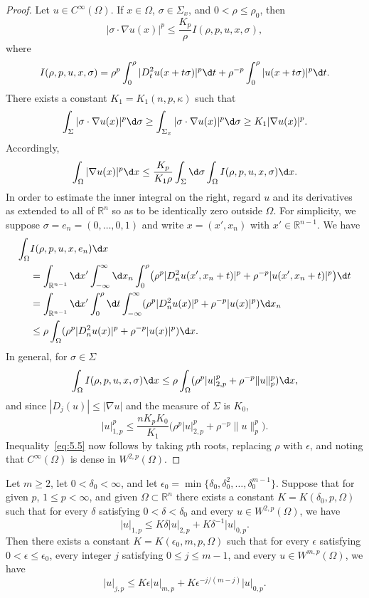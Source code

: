 \begin{proof}
  Let $u\in C^\infty(\Omega)$. If $x\in\Omega$, $\sigma\in\Sigma_x$,
  and $0<\rho\leq\rho_0$, then
  \[ |\sigma\cdot\nabla u(x)|^p \leq \frac{K_p}{\rho} I(\rho,p,u,x,\sigma), \]
  where
  \[ I(\rho,p,u,x,\sigma) = \rho^p \int_0^\rho |D_t^2 u(x+t\sigma)|^p \d t
      + \rho^{-p} \int_0^\rho |u(x+t\sigma)|^p \d t. \]
      There exists a constant $K_1=K_1(n,p,\kappa)$ such that
  \[\int_\Sigma |\sigma\cdot\nabla u(x)|^p \d\sigma
    \geq \int_{\Sigma_x} |\sigma\cdot\nabla u(x)|^p \d\sigma
    \geq K_1 |\nabla u(x)|^p.\]
  Accordingly,
  \[ \int_\Omega |\nabla u(x)|^p \d x
      \leq \frac{K_p}{K_1\rho} \int_\Sigma \d\sigma \int_\Omega I(\rho,p,u,x,\sigma) \d x. \]
  In order to estimate the inner integral on the right, regard $u$
  and its derivatives as extended to all of $\mathbb{R}^n$ so as to be
  identically zero outside $\Omega$. For simplicity, we suppose
  $\sigma = e_n = (0,\ldots,0,1)$ and write $x=(x',x_n)$ with $x'\in\mathbb{R}^{n-1}$.
  We have
  \begin{align*}
    \int_\Omega & I(\rho,p,u,x,e_n) \d x \\
    & = \int_{\mathbb{R}^{n-1}} \d x' \int_{-\infty}^\infty \d x_n
        \int_0^\rho \bigl(\rho^p |D_n^2 u(x',x_n+t)|^p + \rho^{-p} |u(x',x_n+t)|^p\bigr) \d t \\
    & = \int_{\mathbb{R}^{n-1}} \d x' \int_0^\rho \d t
        \int_{-\infty}^\infty (\rho^p |D_n^2 u(x)|^p + \rho^{-p} |u(x)|^p) \d x_n \\
    & \leq \rho \int_\Omega (\rho^p |D_n^2 u(x)|^p + \rho^{-p} |u(x)|^p) \d x.
  \end{align*}
  In general, for $\sigma\in\Sigma$
  \[ \int_\Omega I(\rho,p,u,x,\sigma) \d x \leq \rho
        \int_\Omega (\rho^p |u|_{2,p}^p + \rho^{-p}\|u\|_p^p) \d x, \]
  and since $|D_j(u)|\leq |\nabla u|$ and the measure of $\Sigma$ is $K_0$,
  \[ |u|_{1,p}^p \leq \frac{nK_pK_0}{K_1} \bigl(\rho^p |u|_{2,p}^p + \rho^{-p} \|u\|_p^p\bigr). \]
  Inequality~\eqref{eq:5.5} now follows by taking $p$th roots, replacing
  $\rho$ with $\epsilon$, and noting that $C^\infty(\Omega)$ is dense in $W^{2,p}(\Omega)$.
\end{proof}


\begin{lemma}
  Let $m\geq 2$, let $0<\delta_0<\infty$, and let
  $\epsilon_0 = \min\{\delta_0,\delta_0^2,\ldots,\delta_0^{m-1}\}$.
  Suppose that for given $p$, $1\leq p<\infty$, and given $\Omega\subset \mathbb{R}^n$
  there exists a constant $K = K(\delta_0,p,\Omega)$ such that for every $\delta$
  satisfying $0<\delta<\delta_0$ and every $u\in W^{2,p}(\Omega)$, we have
  \begin{equation}\label{eq:5.6}
    |u|_{1,p} \leq K\delta |u|_{2,p} + K\delta^{-1} |u|_{0,p}.
  \end{equation}
  Then there exists a constant $K = K(\epsilon_0,m,p,\Omega)$ such that
  for every $\epsilon$ satisfying $0<\epsilon\leq\epsilon_0$, every integer $j$
  satisfying $0\leq j\leq m-1$, and every $u\in W^{m,p}(\Omega)$, we have
  \begin{equation}\label{eq:5.7}
    |u|_{j,p} \leq K\epsilon |u|_{m,p} + K\epsilon^{-j/(m-j)} |u|_{0,p}.
  \end{equation}
\end{lemma}


